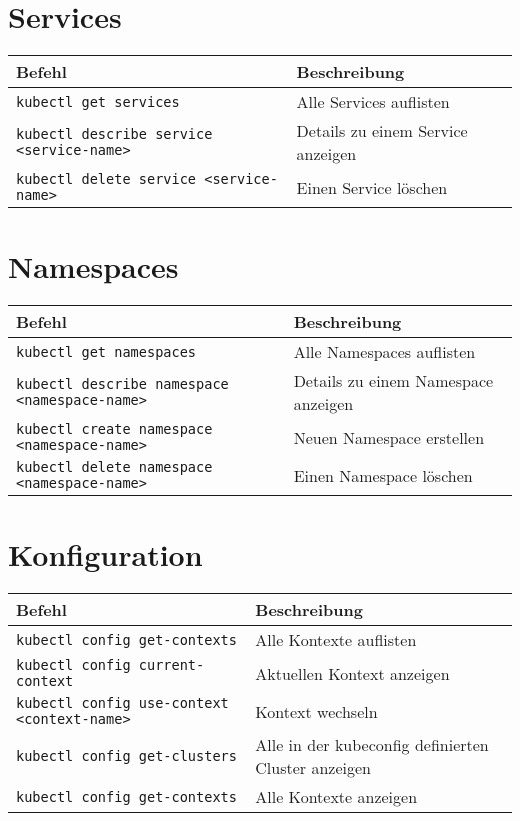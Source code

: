 \section{Services}
\begin{tabular}{|p{}|p{}|}
\hline
\textbf{Befehl} & \textbf{Beschreibung}\\
\hline
\texttt{kubectl get services} & Alle Services auflisten \\
\texttt{kubectl describe service <service-name>} & Details zu einem Service anzeigen \\
\texttt{kubectl delete service <service-name>} & Einen Service löschen \\
\hline
\end{tabular}

\section{Namespaces}
\begin{tabular}{|p{}|p{}|}
\hline
\textbf{Befehl} & \textbf{Beschreibung} \\
\hline
\texttt{kubectl get namespaces} & Alle Namespaces auflisten \\
\texttt{kubectl describe namespace <namespace-name>} & Details zu einem Namespace anzeigen \\
\texttt{kubectl create namespace <namespace-name>} & Neuen Namespace erstellen \\
\texttt{kubectl delete namespace <namespace-name>} & Einen Namespace löschen \\
\hline
\end{tabular}

\section{Konfiguration}
\begin{tabular}{|p{}|p{}|}
\hline
\textbf{Befehl} & \textbf{Beschreibung} \\
\hline
\texttt{kubectl config get-contexts} & Alle Kontexte auflisten \\
\texttt{kubectl config current-context} & Aktuellen Kontext anzeigen \\
\texttt{kubectl config use-context <context-name>} & Kontext wechseln \\
\texttt{kubectl config get-clusters} & Alle in der kubeconfig definierten Cluster anzeigen \\
\texttt{kubectl config get-contexts} & Alle Kontexte anzeigen \\
\hline
\end{tabular}